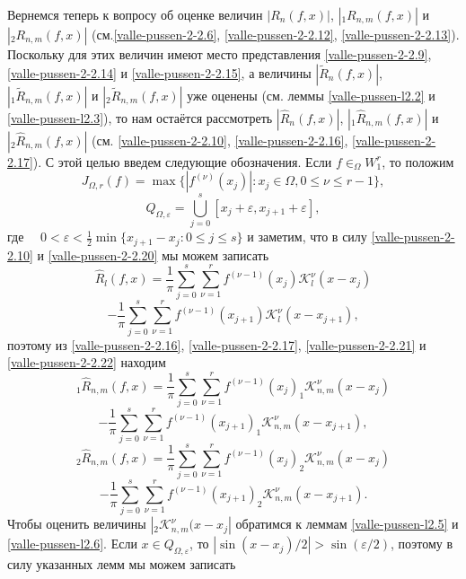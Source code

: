 Вернемся теперь к вопросу об оценке величин  $ |R_n(f,x)|$, $| _1R_{n,m}(f,x)|$ и
$|_2R_{n,m}(f,x)|$ \linebreak(см.\eqref{valle-pussen-2-2.6}, \eqref{valle-pussen-2-2.12},  \eqref{valle-pussen-2-2.13}). Поскольку для этих величин
имеют место представления \eqref{valle-pussen-2-2.9}, \eqref{valle-pussen-2-2.14} и \eqref{valle-pussen-2-2.15}, а величины
$|\tilde R_n(f,x)|$, $|_1\tilde R_{n,m}(f,x)|$ и  $|_2\tilde R_{n,m}(f,x)|$ уже оценены (см. леммы \ref{valle-pussen-l2.2} и \ref{valle-pussen-l2.3}), то нам остаётся рассмотреть
 $|\hat R_n(f,x)|$, $|_1\hat R_{n,m}(f,x)|$ и  $|_2\hat R_{n,m}(f,x)|$ (см. \eqref{valle-pussen-2-2.10}, \eqref{valle-pussen-2-2.16},   \eqref{valle-pussen-2-2.17}). С этой целью введем следующие обозначения. Если $f\in _\Omega W_1^r$, то положим
\begin{equation}\label{valle-pussen-2-3.1}
J_{\Omega,r}(f)=\max\{|f^{(\nu)}(x_j)|: x_j\in\Omega,0\le\nu\le r-1\},
\end{equation}
\begin{equation}\label{valle-pussen-2-3.2}
Q_{\Omega,\varepsilon}=\bigcup_{j=0}^s[x_j+\varepsilon,x_{j+1}+\varepsilon],
\end{equation}
где $\quad 0<\varepsilon<\frac12\min\{x_{j+1}-x_{j}:0\le j\le s\}$ и
заметим, что в силу \eqref{valle-pussen-2-2.10} и \eqref{valle-pussen-2-2.20} мы можем записать
$$
 \hat R_l(f,x)=\frac{1}{\pi}\sum_{j=0}^s
\sum_{\nu=1}^rf^{(\nu-1)}(x_j)\mathcal{ K}_l^\nu(x-x_j)
$$
\begin{equation}\label{valle-pussen-2-3.3}
-\frac{1}{\pi}\sum_{j=0}^s
\sum_{\nu=1}^r f^{(\nu-1)}(x_{j+1})\mathcal{ K}_l^\nu(x-x_{j+1}),
\end{equation}
поэтому из \eqref{valle-pussen-2-2.16}, \eqref{valle-pussen-2-2.17}, \eqref{valle-pussen-2-2.21} и \eqref{valle-pussen-2-2.22} находим
$$
 _1\hat R_{n,m}(f,x)=\frac{1}{\pi}\sum_{j=0}^s
\sum_{\nu=1}^rf^{(\nu-1)}(x_j)_1\mathcal{ K}_{n,m}^\nu(x-x_j)
$$
\begin{equation}\label{valle-pussen-2-3.4}
-\frac{1}{\pi}\sum_{j=0}^s
\sum_{\nu=1}^r f^{(\nu-1)}(x_{j+1})_1\mathcal{ K}_{n,m}^\nu(x-x_{j+1}),
\end{equation}
$$
 _2\hat R_{n,m}(f,x)=\frac{1}{\pi}\sum_{j=0}^s
\sum_{\nu=1}^rf^{(\nu-1)}(x_j)_2\mathcal{ K}_{n,m}^\nu(x-x_j)
$$
\begin{equation}\label{valle-pussen-2-3.5}
-\frac{1}{\pi}\sum_{j=0}^s
\sum_{\nu=1}^r f^{(\nu-1)}(x_{j+1})_2\mathcal{ K}_{n,m}^\nu(x-x_{j+1}).
\end{equation}
Чтобы оценить величины $|_2\mathcal{ K}_{n,m}^\nu(x-x_{j}|$ обратимся к леммам \ref{valle-pussen-l2.5} и \ref{valle-pussen-l2.6}. Если $x\in Q_{\Omega,\varepsilon}$, то $|\sin(x-x_j)/2|>\sin(\varepsilon/2)$, поэтому в силу указанных лемм мы можем записать
